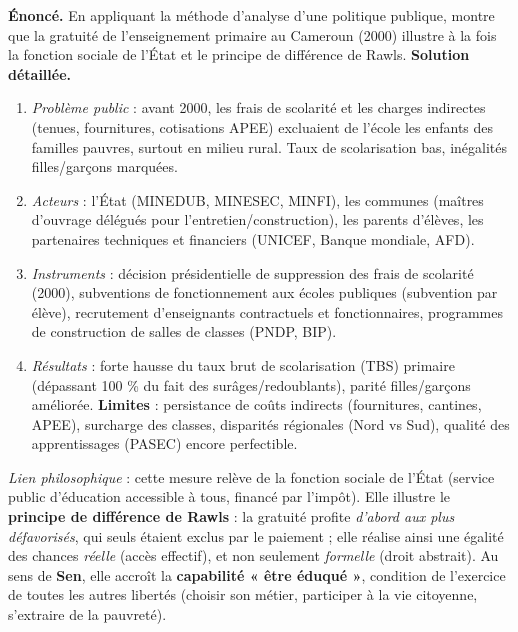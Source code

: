 \documentclass[11pt]{article}
\begin{document}
\begin{exoresolu}
\textbf{Énoncé.} En appliquant la méthode d'analyse d'une politique publique, montre que la gratuité de l'enseignement primaire au Cameroun (2000) illustre à la fois la fonction sociale de l'État et le principe de différence de Rawls.
\tcblower
\textbf{Solution détaillée.}
\begin{enumerate}
\item \emph{Problème public} : avant 2000, les frais de scolarité et les charges indirectes (tenues, fournitures, cotisations APEE) excluaient de l'école les enfants des familles pauvres, surtout en milieu rural. Taux de scolarisation bas, inégalités filles/garçons marquées.
\item \emph{Acteurs} : l'État (MINEDUB, MINESEC, MINFI), les communes (maîtres d'ouvrage délégués pour l'entretien/construction), les parents d'élèves, les partenaires techniques et financiers (UNICEF, Banque mondiale, AFD).
\item \emph{Instruments} : décision présidentielle de suppression des frais de scolarité (2000), subventions de fonctionnement aux écoles publiques (subvention par élève), recrutement d'enseignants contractuels et fonctionnaires, programmes de construction de salles de classes (PNDP, BIP).
\item \emph{Résultats} : forte hausse du taux brut de scolarisation (TBS) primaire (dépassant 100 \% du fait des surâges/redoublants), parité filles/garçons améliorée. \textbf{Limites} : persistance de coûts indirects (fournitures, cantines, APEE), surcharge des classes, disparités régionales (Nord vs Sud), qualité des apprentissages (PASEC) encore perfectible.
\end{enumerate}
\emph{Lien philosophique} : cette mesure relève de la fonction sociale de l'État (service public d'éducation accessible à tous, financé par l'impôt). Elle illustre le \textbf{principe de différence de Rawls} : la gratuité profite \emph{d'abord aux plus défavorisés}, qui seuls étaient exclus par le paiement ; elle réalise ainsi une égalité des chances \emph{réelle} (accès effectif), et non seulement \emph{formelle} (droit abstrait). Au sens de \textbf{Sen}, elle accroît la \textbf{capabilité « être éduqué »}, condition de l'exercice de toutes les autres libertés (choisir son métier, participer à la vie citoyenne, s'extraire de la pauvreté).
\end{exoresolu}
\end{document}
